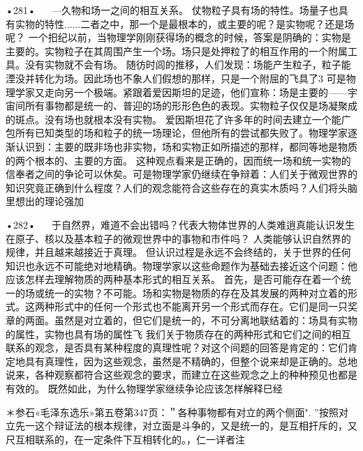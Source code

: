 •281•
  
—久物和场一之间的相互关系。
仗物粒子具有场的特性。场量子也具有实物的特性......二者之中，那一个是最根本的，或主要的呢？是实物呢？还是场呢？
一个抇纪以前，当物理学刚刚获得场的概念的时候，答案是阴确的：实物是主要的。实物粒子在其周围产生一个场。场只是处押粒了的相互作用的一个附属工具。没有实物就不会有场。
随彷时闾的推移，人们发现：场能产生粒子，粒子能湮没并转化为场。因此场也不象人们假想的那样，只是一个附屈的飞具了3
可是物理学家又走向另一个极端。紧跟着爱因斯坦的足迹，他们宣称：场是主要的——宇宙间所有事物都是统一的、普迎的场的形形色色的表现。实物粒子仅仅是场凝聚成的斑点。没有场也就根本没有实物。
爱因斯坦花了许多年的时间去建立一个能广包所有已知类型的场和粒子的统一场理论，但他所有的尝试都失败了。物理学家逐渐认识到：主要的既非场也非实物，场和实物正如所描述的那样，都同等地是物质的两个根本的、主要的方面。
这种观点看来是正确的，因而统一场和统一实物的信奉者之间的争论可以休矣。可是物理学家仍继续在争辩着：人们关于微观世界的知识究竟正确到什么程度？人们的观念能符合这些存在的真实木质吗？人们将头脑里想出的理论强加

•282•
  
于自然界，难道不会出错吗？代表大物体世界的人类难逍真能认识发生在原子、核以及基本粒子的微观世界中的事物和市件吗？
人类能够认识自然界的规律，并且越来越接近于真理。
但认识过程是永远不会终结的，关于世界的任何知识也永远不可能绝对地精确。物理学家以这些命题作为基础去接近这个问题：他应该怎样去理解物质的两种基本形式的相互关系。
首先，是否可能存在着一个统一的场或统一的实物？不可能。场和实物是物质的存在及其发展的两种对立着的形式。这两种形式中的任何一个形式也不能离开另一个形式而存在。它们是同一只奖章的两面。虽然是对立着的，但它们是统一的，不可分离地联结着的：场具有实物的属性，实物也具有场的属性飞
我们关于物质存在的两种形式和它们之间的相互联系的观念，是否具有某种程度的真理性呢？对这个间题的回答是肯定的：它们肯定地具有真理性，因为这些观念，虽然是不精确的，但整个说来却是正确的。总地说来，各种观察都符合这些观念的要求，而建立在这些观念之上的种种预见也都是有效的。
既然如此，为什么物理学家继续争论应该怎样解释巳经

＊参石«毛泽东选乐»第五卷第347页：＂各种事物都有对立的两个侧面".
”按照对立先一这个辩证法的根本规律，对立面是斗争的，又是统一的，是互相扞斥的，又尺互相联系的，在一定条件下互相转化的。，仁一详者注

